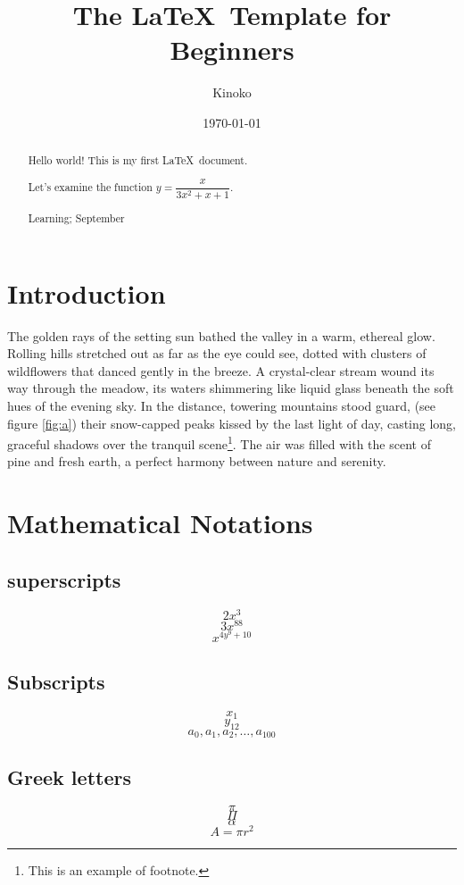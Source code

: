 \documentclass[12pt, a4paper]{article}
\title{The \LaTeX\ Template for Beginners}
\author{Kinoko}
\date{\today}
\def\eq11{$y=\dfrac{x}{3x^2+x+1}$}
\begin{document}
\maketitle

\begin{abstract}
    Hello world! This is my first \LaTeX\ document. 

    Let's examine the function \eq11.

    \lipsum[1]

    \begin{keywords}
    Learning; September
    \end{keywords}
\end{abstract}
\newpage
\tableofcontents
\newpage

\section{Introduction}

The golden rays of the setting sun bathed the valley in a warm,
 ethereal glow. 
 Rolling hills stretched out as far as the eye could see, 
 dotted with clusters of wildflowers that danced gently 
 in the breeze. 
 A crystal-clear stream wound its way through the meadow, 
 its waters shimmering like liquid glass beneath the soft hues 
 of the evening sky. 
 In the distance, towering mountains stood guard, (see figure \ref{fig:a})
 their snow-capped peaks kissed by the last light of day, 
 casting long, graceful shadows over the tranquil scene\footnote{This is an example of footnote.}. 
 The air was filled with the scent of pine and fresh earth, a perfect harmony between nature and serenity.
\section{Mathematical Notations}
\subsection{superscripts} 
$$2x^3$$
$$3x^{88}$$
$$x^{4y^9+10}$$

\subsection{Subscripts}
$$x_1$$
$$y_{12}$$
$$a_0,a_1,a_2,\dots,a_{100}$$

\subsection{Greek letters}
$$\pi$$
$$\Pi$$
$$\alpha$$
$$A=\pi r^2$$
\end{document}
